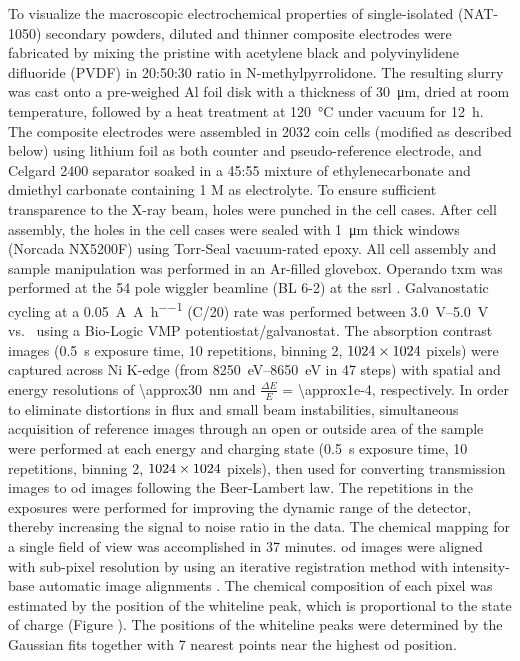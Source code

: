 \documentclass{article}
\begin{document}
To visualize the macroscopic electrochemical properties of
single-isolated \nca{} (NAT-1050) secondary powders, diluted and
thinner composite electrodes were fabricated by mixing the pristine
\nca{} with acetylene black and polyvinylidene difluoride (PVDF) in
20:50:30 ratio in N-methylpyrrolidone. The resulting slurry was cast
onto a pre-weighed Al foil disk with a thickness of
\SI{30}{\micro\meter}, dried at room temperature, followed by a heat
treatment at \SI{120}{\celsius} under vacuum for \SI{12}{\hour}. The
composite electrodes were assembled in 2032 coin cells (modified as described below) using lithium foil as both counter
and pseudo-reference electrode, and Celgard 2400 separator soaked in a
45:55 mixture of ethylenecarbonate and dmiethyl carbonate containing 1
M  as electrolyte. To ensure sufficient transparence to the
X-ray beam, holes were punched in the cell cases. After cell assembly,
the holes in the cell cases were sealed with \SI{1}{\micro\meter}
thick  windows (Norcada NX5200F) using Torr-Seal
vacuum-rated epoxy. All cell assembly and sample manipulation was
performed in an Ar-filled glovebox. Operando \gls{txm} was performed
at the 54 pole wiggler beamline (BL 6-2) at the \gls{ssrl}
\cite{yun2008}. Galvanostatic cycling at a
\SI{0.05}{\ampere\per\ampere\per\hour} (C/20) rate was performed
between \SIrange{3.0}{5.0}{\volt} vs.\  using a Bio-Logic
VMP potentiostat/galvanostat. The absorption contrast images
(\SI{0.5}{\second} exposure time, 10 repetitions,
binning 2, $\rm 1024\times 1024$ pixels) were captured across Ni
K-edge (from \SIrange{8250}{8650}{\electronvolt} in 47 steps) with spatial and energy resolutions of
\SI{\approx30}{\nano\meter} and $\frac{\Delta E}{E}$ =
\num{\approx1e-4}, respectively. In order to eliminate distortions in
flux and small beam instabilities, simultaneous acquisition of
reference images through an open or outside area of the sample were
performed at each energy and charging state (\SI{0.5}{\second}
exposure time, 10 repetitions, binning 2, $\rm 1024
\times 1024$ pixels), then used for converting transmission images to
\gls{od} images following the Beer-Lambert law. The repetitions in the
exposures were performed for improving the dynamic range of the
detector, thereby increasing the signal to noise ratio in the
data. The chemical mapping for a single field of view was accomplished
in 37 minutes. \Gls{od} images were aligned with
sub-pixel resolution by using an iterative registration method with
intensity-base automatic image alignments \cite{lee2019-3}. The
chemical composition of each pixel was estimated by the position of
the whiteline peak, which is proportional to the state of charge
(Figure ). The positions of the
whiteline peaks were determined by the Gaussian fits together with 7
nearest points near the highest \gls{od} position.
\end{document}
